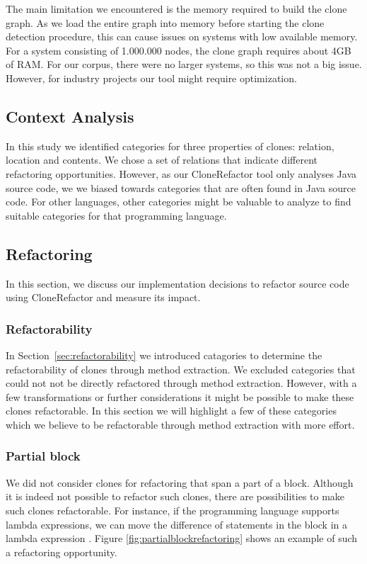 The main limitation we encountered is the memory required to build the clone graph. As we load the entire graph into memory before starting the clone detection procedure, this can cause issues on systems with low available memory. For a system consisting of 1.000.000 nodes, the clone graph requires about 4GB of RAM. For our corpus, there were no larger systems, so this was not a big issue. However, for industry projects our tool might require optimization.

\subsection{Context Analysis}
In this study we identified categories for three properties of clones: relation, location and contents. %
We chose a set of relations that indicate different refactoring opportunities. However, as our CloneRefactor tool only analyses Java source code, we we biased towards categories that are often found in Java source code. For other languages, other categories might be valuable to analyze to find suitable categories for that programming language.

\subsection{Refactoring}
In this section, we discuss our implementation decisions to refactor source code using CloneRefactor and measure its impact.

\subsubsection{Refactorability} \label{sec:discussrefactorability}
In Section~\ref{sec:refactorability} we introduced catagories to determine the refactorability of clones through method extraction. We excluded categories that could not not be directly refactored through method extraction. However, with a few transformations or further considerations it might be possible to make these clones refactorable. In this section we will highlight a few of these categories which we believe to be refactorable through method extraction with more effort.

\subsubsection{Partial block} \label{sec:partialblockdiscussion}
We did not consider clones for refactoring that span a part of a block. Although it is indeed not possible to refactor such clones, there are possibilities to make such clones refactorable. For instance, if the programming language supports lambda expressions, we can move the difference of statements in the block in a lambda expression \cite{tsantalis2017clone}. Figure \ref{fig:partialblockrefactoring} shows an example of such a refactoring opportunity.

